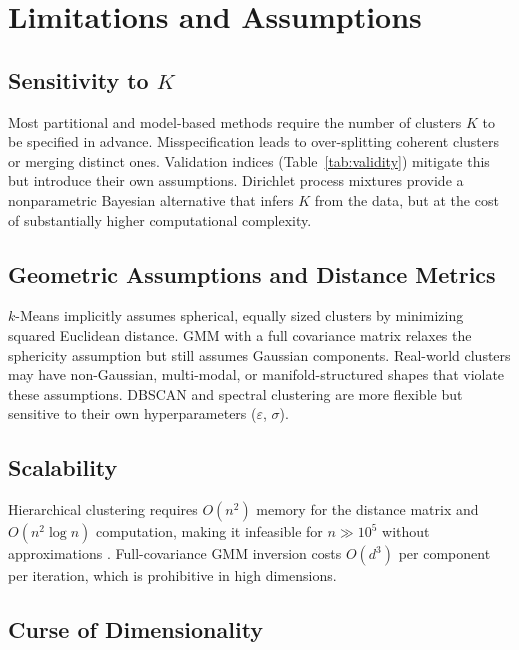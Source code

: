 \documentclass[conference]{IEEEtran}
\begin{document}
\section{Limitations and Assumptions}
\label{sec:limitations}

\subsection{Sensitivity to $K$}

Most partitional and model-based methods require the number of clusters $K$ to be specified in advance. Misspecification leads to over-splitting coherent clusters or merging distinct ones. Validation indices (Table~\ref{tab:validity}) mitigate this but introduce their own assumptions. Dirichlet process mixtures \cite{ferguson1973bayesian} provide a nonparametric Bayesian alternative that infers $K$ from the data, but at the cost of substantially higher computational complexity.

\subsection{Geometric Assumptions and Distance Metrics}

$k$-Means implicitly assumes spherical, equally sized clusters by minimizing squared Euclidean distance. GMM with a full covariance matrix relaxes the sphericity assumption but still assumes Gaussian components. Real-world clusters may have non-Gaussian, multi-modal, or manifold-structured shapes that violate these assumptions. DBSCAN and spectral clustering are more flexible but sensitive to their own hyperparameters ($\varepsilon$, $\sigma$).

\subsection{Scalability}

Hierarchical clustering requires $O(n^2)$ memory for the distance matrix and $O(n^2 \log n)$ computation, making it infeasible for $n \gg 10^5$ without approximations \cite{mullner2011modern}. Full-covariance GMM inversion costs $O(d^3)$ per component per iteration, which is prohibitive in high dimensions.

\subsection{Curse of Dimensionality}
\end{document}
